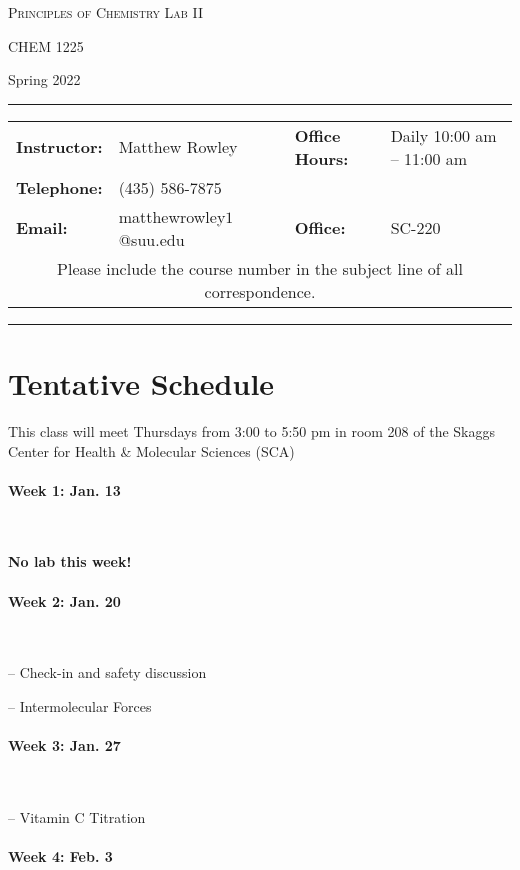 \documentclass[12pt, letterpaper]{article}
\begin{document}
\begin{center}
{\Large \textsc{Principles of Chemistry Lab II}}

CHEM 1225
\end{center}

\begin{center}
{\large Spring 2022}
\end{center}
\begin{center}
	\rule{0.99\textwidth}{0.4pt}
	\begin{tabular}{llcll}
		\textbf{Instructor:} & Matthew Rowley & & \textbf{Office Hours:} & Daily 10:00 am -- 11:00 am \\
		\textbf{Telephone:} & (435) 586-7875 & & & \\
		\textbf{Email:} & matthewrowley$1$@suu.edu  & & \textbf{Office:} & SC-220\\
		\multicolumn{5}{c}{Please include the course number in the subject line of all correspondence.}
	\end{tabular}
	\rule{0.99\textwidth}{0.4pt}
\end{center}

\section*{Tentative Schedule}
This class will meet Thursdays from 3:00 to 5:50 pm in room 208 of the Skaggs Center for Health \& Molecular Sciences (SCA)

\paragraph{Week 1: Jan. 13}~

\textbf{No lab this week!}

\paragraph{Week 2: Jan. 20}~

-- Check-in and safety discussion

-- Intermolecular Forces

\paragraph{Week 3: Jan. 27}~

-- Vitamin C Titration

\paragraph{Week 4: Feb. 3}~
\end{document}
